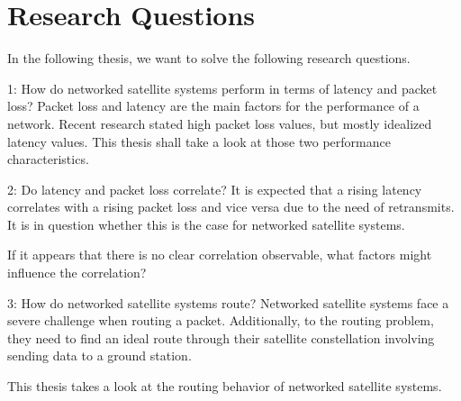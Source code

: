\section{Research Questions} \label{sec:research-questions}

In the following thesis, we want to solve the following research questions.

\begin{rqbox}{1: How do networked satellite systems perform in terms of latency and packet loss?}
	Packet loss and latency are the main factors for the performance of a network.
	Recent research stated high packet loss values, but mostly idealized latency values.
	This thesis shall take a look at those two performance characteristics.
\end{rqbox}

\begin{rqbox}{2: Do latency and packet loss correlate?}
	It is expected that a rising latency correlates with a rising packet loss and vice versa due to the need of retransmits.
	It is in question whether this is the case for networked satellite systems.

	If it appears that there is no clear correlation observable, what factors might influence the correlation?
\end{rqbox}

\begin{rqbox}{3: How do networked satellite systems route?}
	Networked satellite systems face a severe challenge when routing a packet.
	Additionally, to the routing problem, they need to find an ideal route through their
	satellite constellation involving sending data to a ground station.

	This thesis takes a look at the routing behavior of networked satellite systems.
\end{rqbox}

